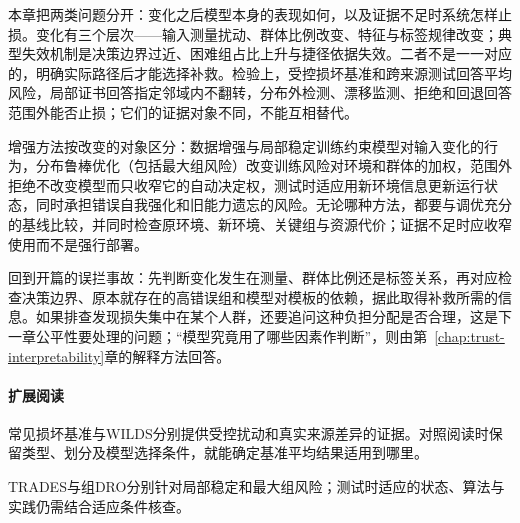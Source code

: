 本章把两类问题分开：变化之后模型本身的表现如何，以及证据不足时系统怎样止损。变化有三个层次——输入测量扰动、群体比例改变、特征与标签规律改变；典型失效机制是决策边界过近、困难组占比上升与捷径依据失效。二者不是一一对应的，明确实际路径后才能选择补救。检验上，受控损坏基准和跨来源测试回答平均风险，局部证书回答指定邻域内不翻转，分布外检测、漂移监测、拒绝和回退回答范围外能否止损；它们的证据对象不同，不能互相替代。

增强方法按改变的对象区分：数据增强与局部稳定训练约束模型对输入变化的行为，分布鲁棒优化（包括最大组风险）改变训练风险对环境和群体的加权，范围外拒绝不改变模型而只收窄它的自动决定权，测试时适应用新环境信息更新运行状态，同时承担错误自我强化和旧能力遗忘的风险。无论哪种方法，都要与调优充分的基线比较，并同时检查原环境、新环境、关键组与资源代价；证据不足时应收窄使用而不是强行部署。

回到开篇的误拦事故：先判断变化发生在测量、群体比例还是标签关系，再对应检查决策边界、原本就存在的高错误组和模型对模板的依赖，据此取得补救所需的信息。如果排查发现损失集中在某个人群，还要追问这种负担分配是否合理，这是下一章公平性要处理的问题；“模型究竟用了哪些因素作判断”，则由第~\ref{chap:trust-interpretability}章的解释方法回答。

\paragraph{扩展阅读}

常见损坏基准与WILDS分别提供受控扰动和真实来源差异的证据。对照阅读时保留类型、划分及模型选择条件，就能确定基准平均结果适用到哪里。

TRADES与组DRO分别针对局部稳定和最大组风险；测试时适应的状态、算法与实践仍需结合适应条件核查。
